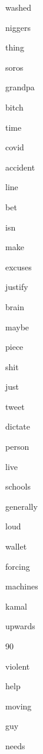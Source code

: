 \documentclass[varwidth]{standalone}
\begin{document}
\begin{CJK*}{UTF8}{gbsn}
{{{\colorbox{red!2.994877815246582}{\strut washed}
\colorbox{red!13.266844749450684}{\strut niggers}
\colorbox{red!8.563370704650879}{\strut thing}
\colorbox{red!9.437238693237305}{\strut soros}
\colorbox{red!9.639018058776855}{\strut grandpa}
\colorbox{red!6.025434494018555}{\strut bitch}
\colorbox{red!5.867055892944336}{\strut time}
\colorbox{red!12.23067855834961}{\strut covid}
\colorbox{red!6.226003646850586}{\strut accident}
\colorbox{red!5.576902389526367}{\strut line}
\colorbox{red!10.7896089553833}{\strut bet}
\colorbox{red!8.179478645324707}{\strut isn}
\colorbox{red!15.046061515808105}{\strut make}
\colorbox{red!2.700183868408203}{\strut excuses}
\colorbox{red!3.7837705612182617}{\strut justify}
\colorbox{red!6.871384620666504}{\strut brain}
\colorbox{red!7.761341094970703}{\strut maybe}
\colorbox{red!4.743539810180664}{\strut piece}
\colorbox{red!7.8014020919799805}{\strut shit}
\colorbox{red!7.203361511230469}{\strut just}
\colorbox{red!9.38691520690918}{\strut tweet}
\colorbox{red!9.983171463012695}{\strut dictate}
\colorbox{red!3.64022159576416}{\strut person}
\colorbox{red!5.533893585205078}{\strut live}
\colorbox{red!4.517919540405273}{\strut schools}
\colorbox{red!3.004392623901367}{\strut generally}
\colorbox{red!5.62191104888916}{\strut loud}
\colorbox{red!5.678606033325195}{\strut wallet}
\colorbox{red!7.917152404785156}{\strut forcing}
\colorbox{red!5.145631790161133}{\strut machines}
\colorbox{red!9.505362510681152}{\strut kamal}
\colorbox{red!2.9199447631835938}{\strut upwards}
\colorbox{red!7.079938888549805}{\strut 90}
\colorbox{red!7.831254959106445}{\strut violent}
\colorbox{red!8.997055053710938}{\strut help}
\colorbox{red!3.045651435852051}{\strut moving}
\colorbox{red!7.580195903778076}{\strut guy}
\colorbox{red!6.169318199157715}{\strut needs}

}}}
\end{CJK*}
\end{document}
